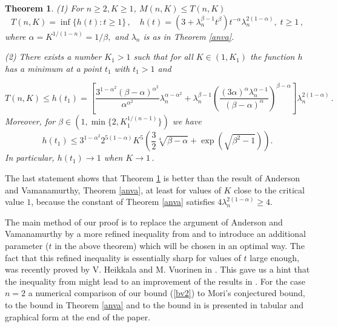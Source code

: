 \documentclass[12pt,a4paper,leqno]{amsart}
\theoremstyle{plain}
\newtheorem{theorem}[equation]{Theorem}
\numberwithin{equation}{section}          %
\begin{document}
\begin{theorem} \label{bvthm} (1) For $n\geq 2,K\geq 1$, $M(n,K) \le T(n,K)$
\begin{equation} \label{bv1} T(n,K) = \inf \{ h(t) : t \ge 1  \}\,, \quad h(t)
=(3+\lambda_n^{\beta-1} t^{\beta} ) t^{-\alpha}
\lambda_n^{2(1-\alpha)},\;t\ge 1\,,
\end{equation}
where $\alpha=K^{1/(1-n)} =1/\beta,$ and $\lambda_n$ is as in
Theorem \ref{anva}.

(2) There exists a number $K_1>1$ such that for all
$K \in (1,K_1)$ the function $h$ has a minimum at a point $t_1$ with $t_1>1$
and

\begin{equation} \label{bv2}
 T(n,K) \le h(t_1) = \left[ \frac{3^{1-\alpha^2} (\beta-\alpha)^{\alpha^2}}{\alpha^{\alpha^2}} \lambda_n^{\alpha- \alpha^2}
  + \lambda_n^{\beta-1} \left(\frac{(3 \alpha)^\alpha \lambda_n^{\alpha-1}}{(\beta-\alpha)^{\alpha} }   \right) ^{\beta-\alpha} \right]\lambda_n^{2(1-\alpha)} \,.
 \end{equation}
Moreover, for $\beta\in(1,\min\{2,K_1^{1/(n-1)}\})$ we have
\begin{equation}\label{uph}
h(t_1)\leq 3^{1-\alpha^2}2^{5(1-\alpha)}K^5\left(\frac{3}{2}\sqrt[4]{\beta-\alpha}+\exp(\sqrt{\beta^2-1})\right).
\end{equation}
In particular, $h(t_1)\to 1$ when $K\to 1\,.$
\end{theorem}

The last statement shows that Theorem \ref{bvthm}
is better than the result of Anderson and Vamanamurthy,
Theorem  \ref{anva}, at least for values of $K$ close to the critical
value $1$, because the constant of Theorem \ref{anva} satisfies
$4\lambda_n^{2(1-\alpha)} \ge 4. $


The main method of our proof is to replace the argument of Anderson
and Vamanamurthy by a more refined inequality from \cite{vu2} and to
introduce an additional parameter ($t$ in the above theorem) which
will be chosen in an optimal way. The fact that this refined
inequality is essentially sharp for values of $t$ large enough, was
recently proved by V. Heikkala and M. Vuorinen in \cite{hv}. This
gave us a hint that the inequality from \cite{vu2} might lead to an
improvement of the results in \cite{av}. For the case $n=2$ a
numerical comparison of our bound (\ref{bv2}) to Mori's conjectured
bound, to the bound in Theorem \ref{anva} and to the bound in
\cite{fv} is presented in tabular and graphical form at the end of the paper.
\end{document}
